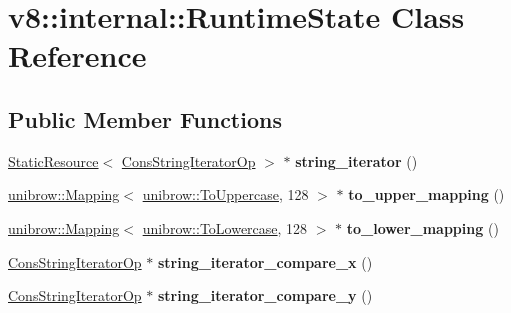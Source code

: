 \hypertarget{classv8_1_1internal_1_1_runtime_state}{}\section{v8\+:\+:internal\+:\+:Runtime\+State Class Reference}
\label{classv8_1_1internal_1_1_runtime_state}
\subsection*{Public Member Functions}
\begin{DoxyCompactItemize}
\item 
\hypertarget{classv8_1_1internal_1_1_runtime_state_ab50dd3dc91398b0540cdbcb09144f4ea}{}\hyperlink{classv8_1_1internal_1_1_static_resource}{Static\+Resource}$<$ \hyperlink{classv8_1_1internal_1_1_cons_string_iterator_op}{Cons\+String\+Iterator\+Op} $>$ $\ast$ {\bfseries string\+\_\+iterator} ()\label{classv8_1_1internal_1_1_runtime_state_ab50dd3dc91398b0540cdbcb09144f4ea}

\item 
\hypertarget{classv8_1_1internal_1_1_runtime_state_a56f5f84f2cdad0b5b4332a27f8db60b6}{}\hyperlink{classunibrow_1_1_mapping}{unibrow\+::\+Mapping}$<$ \hyperlink{structunibrow_1_1_to_uppercase}{unibrow\+::\+To\+Uppercase}, 128 $>$ $\ast$ {\bfseries to\+\_\+upper\+\_\+mapping} ()\label{classv8_1_1internal_1_1_runtime_state_a56f5f84f2cdad0b5b4332a27f8db60b6}

\item 
\hypertarget{classv8_1_1internal_1_1_runtime_state_a93ae0cde56b5f23a3efdb4ad7d12ef23}{}\hyperlink{classunibrow_1_1_mapping}{unibrow\+::\+Mapping}$<$ \hyperlink{structunibrow_1_1_to_lowercase}{unibrow\+::\+To\+Lowercase}, 128 $>$ $\ast$ {\bfseries to\+\_\+lower\+\_\+mapping} ()\label{classv8_1_1internal_1_1_runtime_state_a93ae0cde56b5f23a3efdb4ad7d12ef23}

\item 
\hypertarget{classv8_1_1internal_1_1_runtime_state_ae2868cbb850a7a3a3ed40ec862ed279b}{}\hyperlink{classv8_1_1internal_1_1_cons_string_iterator_op}{Cons\+String\+Iterator\+Op} $\ast$ {\bfseries string\+\_\+iterator\+\_\+compare\+\_\+x} ()\label{classv8_1_1internal_1_1_runtime_state_ae2868cbb850a7a3a3ed40ec862ed279b}

\item 
\hypertarget{classv8_1_1internal_1_1_runtime_state_a3c5e492c28a53fe736123d010d572742}{}\hyperlink{classv8_1_1internal_1_1_cons_string_iterator_op}{Cons\+String\+Iterator\+Op} $\ast$ {\bfseries string\+\_\+iterator\+\_\+compare\+\_\+y} ()\label{classv8_1_1internal_1_1_runtime_state_a3c5e492c28a53fe736123d010d572742}


\end{DoxyCompactItemize}
